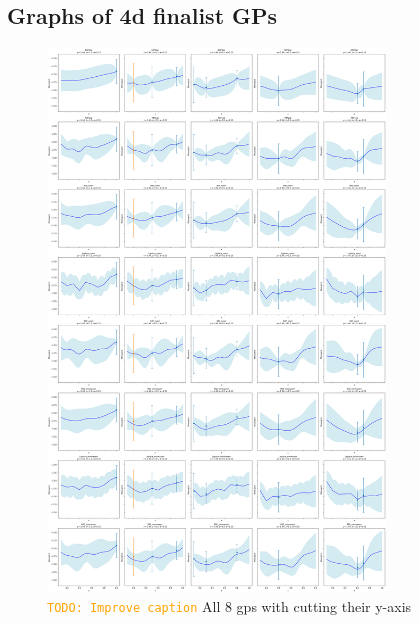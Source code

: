 \documentclass{ucdgradtaughtthesis}
\newcommand{\todo}[1]{\textcolor{orange}{\texttt{TODO: #1}}}
\begin{document}
\subsection{Graphs of 4d finalist GPs}
\label{appendix:C}


\begin{figure}[H]
    \centering
    \includegraphics[width=0.8\textwidth]{LatexPlots/final_gps_plots/final_gps_ycuts.png}
    \caption{\todo{Improve caption} All 8 gps with cutting their y-axis}
    \label{fig:best8_ycuts}
\end{figure}
\end{document}
